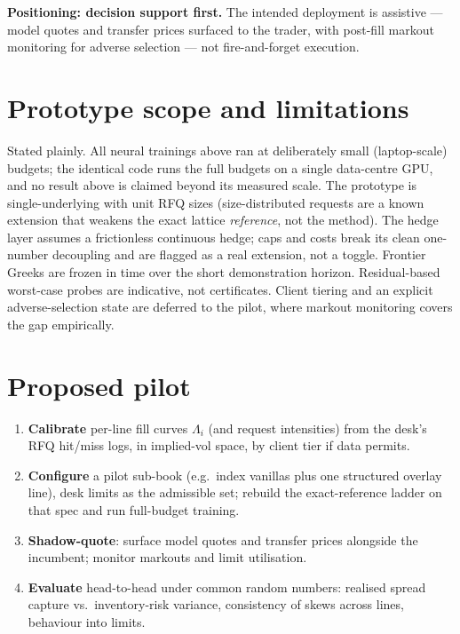 \documentclass[11pt,a4paper]{article}
\begin{document}
\textbf{Positioning: decision support first.} The intended deployment is
assistive --- model quotes and transfer prices surfaced to the trader,
with post-fill markout monitoring for adverse selection --- not
fire-and-forget execution.

\section{Prototype scope and limitations}

Stated plainly. All neural trainings above ran at deliberately small
(laptop-scale) budgets; the identical code runs the full budgets on a
single data-centre GPU, and no result above is claimed beyond its measured
scale. The prototype is single-underlying with unit RFQ sizes
(size-distributed requests are a known extension that weakens the exact
lattice \emph{reference}, not the method). The hedge layer assumes a
frictionless continuous hedge; caps and costs break its clean one-number
decoupling and are flagged as a real extension, not a toggle. Frontier
Greeks are frozen in time over the short demonstration horizon.
Residual-based worst-case probes are indicative, not certificates. Client
tiering and an explicit adverse-selection state are deferred to the pilot,
where markout monitoring covers the gap empirically.

\section{Proposed pilot}

\begin{enumerate}\itemsep0.2em
\item \textbf{Calibrate} per-line fill curves $\Lambda_i$ (and request
  intensities) from the desk's RFQ hit/miss logs, in implied-vol space, by
  client tier if data permits.
\item \textbf{Configure} a pilot sub-book (e.g.\ index vanillas plus one
  structured overlay line), desk limits as the admissible set; rebuild the
  exact-reference ladder on that spec and run full-budget training.
\item \textbf{Shadow-quote}: surface model quotes and transfer prices
  alongside the incumbent; monitor markouts and limit utilisation.
\item \textbf{Evaluate} head-to-head under common random numbers: realised
  spread capture vs.\ inventory-risk variance, consistency of skews across
  lines, behaviour into limits.
\end{enumerate}
\end{document}

